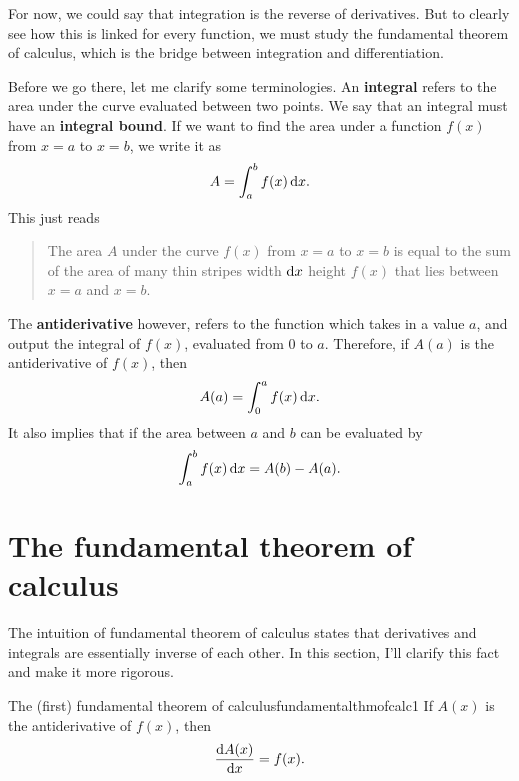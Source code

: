 For now, we could say that integration is the reverse of derivatives. But to clearly see how this is linked for every function, we must study the fundamental theorem of calculus, which is the bridge between integration and differentiation.

Before we go there, let me clarify some terminologies. An \textbf{integral} refers to the area under the curve evaluated between two points. We say that an integral must have an \textbf{integral bound}. If we want to find the area under a function \(f(x)\) from \(x = a\) to \(x = b\), we write it as
\begin{equation}
  A = \int_a^b f(x)\odif{x}.
\end{equation}
This just reads
\begin{quotation}
  The area \(A\) under the curve \(f(x)\) from \(x = a\) to \(x = b\) is equal to the sum of the area of many thin stripes width \(\odif{x}\) height \(f(x)\) that lies between \(x = a\) and \(x = b\).
\end{quotation}
The \textbf{antiderivative} however, refers to the function which takes in a value \(a\), and output the integral of \(f(x)\), evaluated from \(0\) to \(a\). Therefore, if \(A(a)\) is the antiderivative of \(f(x)\), then
\begin{equation}
  A(a) = \int_0^a f(x)\odif{x}.
\end{equation}
It also implies that if the area between \(a\) and \(b\) can be evaluated by
\begin{equation}
  \int_a^b f(x)\odif{x} = A(b) - A(a).
\end{equation}

\section{The fundamental theorem of calculus}
\label{sec:fundamentalthmofcalc}

The intuition of fundamental theorem of calculus states that derivatives and integrals are essentially inverse of each other. In this section, I'll clarify this fact and make it more rigorous.
\begin{theorem}{The (first) fundamental theorem of calculus}{fundamentalthmofcalc1}
  If \(A(x)\) is the antiderivative of \(f(x)\), then
  \begin{equation}
    \odv{A(x)}{x} = f(x).
  \end{equation}
\end{theorem}

